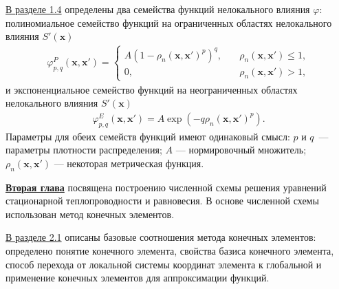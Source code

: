 \underline{В разделе 1.4} определены два семейства функций нелокального влияния $\varphi$: полиномиальное семейство функций на ограниченных областях нелокального влияния $S'(\boldsymbol{x})$
\begin{gather}
	\label{eq:Polynomial}
	\varphi_{p,q}^{P}(\boldsymbol{x}, \boldsymbol{x}') =
	\begin{cases}
		A(1 - \rho_n(\boldsymbol{x}, \boldsymbol{x}')^p)^q, \quad &\rho_n(\boldsymbol{x}, \boldsymbol{x}') \leqslant 1, \\
		0, &\rho_n(\boldsymbol{x}, \boldsymbol{x}') > 1,
	\end{cases}
\end{gather}
и экспоненциальное семейство функций на неограниченных областях нелокального влияния $S'(\boldsymbol{x})$
\begin{gather}
	\label{eq:Exponential}
	\varphi_{p,q}^{E} (\boldsymbol{x}, \boldsymbol{x}') =
	A \exp \left(-q\rho_n(\boldsymbol{x}, \boldsymbol{x}')^p \right).
\end{gather}
Параметры для обеих семейств функций имеют одинаковый смысл: $p$ и $q$~--- параметры плотности распределения; $A$ --- нормировочный множитель; $\rho_n(\boldsymbol{x}, \boldsymbol{x}')$ --- некоторая метрическая функция.

\underline{\textbf{Вторая глава}} посвящена построению численной схемы решения уравнений стационарной теплопроводности и равновесия. В основе численной схемы использован метод конечных элементов.

\underline{В разделе 2.1} описаны базовые соотношения метода конечных элементов: определено понятие конечного элемента, свойства базиса конечного элемента, способ перехода от локальной системы координат элемента к глобальной и применение конечных элементов для аппроксимации функций.


